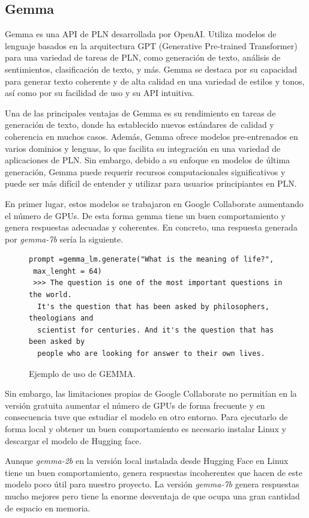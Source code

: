 \subsection{Gemma}

Gemma es una API de PLN desarrollada por OpenAI. Utiliza modelos de lenguaje basados en la arquitectura GPT (Generative Pre-trained Transformer) para una variedad de tareas de PLN, como generación de texto, análisis de sentimientos, clasificación de texto, y más. Gemma se destaca por su capacidad para generar texto coherente y de alta calidad en una variedad de estilos y tonos, así como por su facilidad de uso y su API intuitiva.

Una de las principales ventajas de Gemma es su rendimiento en tareas de generación de texto, donde ha establecido nuevos estándares de calidad y coherencia en muchos casos. Además, Gemma ofrece modelos pre-entrenados en varios dominios y lenguas, lo que facilita su integración en una variedad de aplicaciones de PLN. Sin embargo, debido a su enfoque en modelos de última generación, Gemma puede requerir recursos computacionales significativos y puede ser más difícil de entender y utilizar para usuarios principiantes en PLN.


En primer lugar, estos modelos se trabajaron en Google Collaborate aumentando el número de GPUs. De esta forma gemma tiene un buen comportamiento y genera respuestas adecuadas y coherentes. En concreto, una respuesta generada por \textit{gemma-7b} sería la siguiente.
\begin{figure}[h]
	\centering
	\begin{verbatim}
prompt =gemma_lm.generate("What is the meaning of life?",
 max_lenght = 64)
 >>> The question is one of the most important questions in the world.
  It's the question that has been asked by philosophers, theologians and
  scientist for centuries. And it's the question that has been asked by
  people who are looking for answer to their own lives. 
	\end{verbatim}
	\caption{ Ejemplo de uso de GEMMA.}
	\label{fig:ejemploBARD}
\end{figure}
Sin embargo, las limitaciones propias de Google Collaborate no permitían en la versión gratuita aumentar el número de GPUs de forma frecuente y en consecuencia tuve que estudiar el modelo en otro entorno. Para ejecutarlo de forma local y obtener un buen comportamiento es necesario instalar Linux y descargar el modelo de Hugging face. 

Aunque \textit{gemma-2b} en la versión local instalada desde Hugging Face en Linux tiene un buen comportamiento, genera respuestas incoherentes que hacen de este modelo poco útil para nuestro proyecto. La versión \textit{gemma-7b} genera respuestas mucho mejores pero tiene la enorme desventaja de que ocupa una gran cantidad de espacio en memoria.

